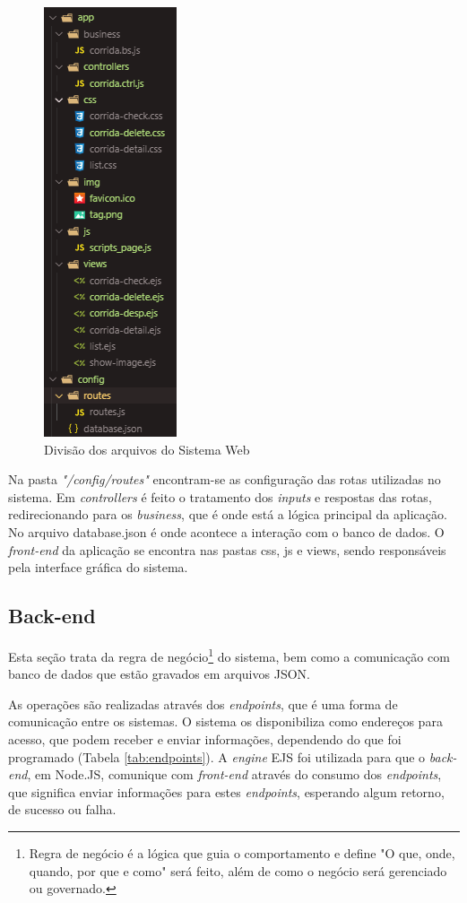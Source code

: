 \begin{figure}[htbp]
	\centering
	\includegraphics[width=0.22\linewidth]{figuras/WebService/cleanArchtecture.png}
	\caption{Divisão dos arquivos do Sistema Web}
	\label{fig:cleanArchtecture}
\end{figure}



Na pasta \textit{"/config/routes"} encontram-se as configuração das rotas utilizadas no sistema. Em \textit{controllers} é feito o tratamento dos \textit{inputs} e respostas das rotas, redirecionando para os \textit{business}, que é onde está a lógica principal da aplicação. No arquivo database.json é onde acontece a interação com o banco de dados. 
%
O \textit{front-end} da aplicação se encontra nas pastas css, js e views, sendo responsáveis pela interface gráfica do sistema.

\subsection{Back-end}

Esta seção trata da regra de negócio\footnote{Regra de negócio é a lógica que guia o comportamento e define "O que, onde, quando, por que e como" será feito, além de como o negócio será gerenciado ou governado.} do sistema, bem como a comunicação com banco de dados que estão gravados em arquivos JSON.

As operações são realizadas através dos \textit{endpoints}, que é uma forma de comunicação entre os sistemas. O sistema os disponibiliza como endereços para acesso, que podem receber e enviar informações, dependendo do que foi programado (Tabela \ref{tab:endpoints}).
%
A \textit{engine} EJS foi utilizada para que o \textit{back-end}, em Node.JS, comunique com \textit{front-end} através do consumo dos \textit{endpoints}, que significa enviar informações para estes \textit{endpoints}, esperando algum retorno, de sucesso ou falha.

